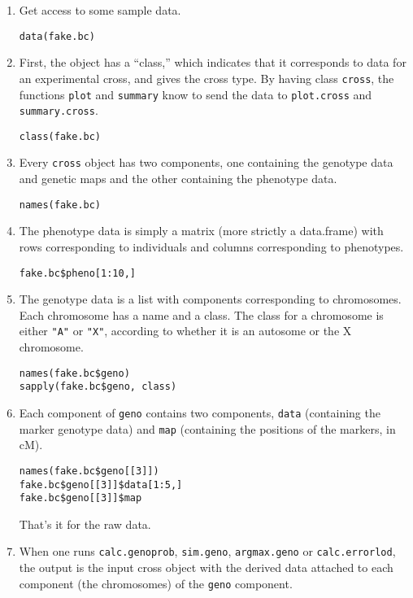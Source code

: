 \documentclass[10pt,letterpaper]{article}
\newcommand{\usercolor}{\color [named]{BlueViolet}}
\begin{document}
\begin{enumerate}

\item Get access to some sample data.

\usercolor \verb|data(fake.bc)| \normalcolor

\item First, the object has a ``class,'' which indicates that it
corresponds to data for an experimental cross, and gives the cross
type.  By having class \verb-cross-, the functions \verb-plot- and
\verb-summary- know to send the data to \verb-plot.cross- and
\verb-summary.cross-.

\usercolor \verb|class(fake.bc)| \normalcolor

\item Every \verb-cross- object has two components, one containing the
genotype data and genetic maps and the other containing the phenotype
data.

\usercolor \verb|names(fake.bc)| \normalcolor

\item The phenotype data is simply a matrix (more strictly a
data.frame) with rows corresponding to individuals and columns
corresponding to phenotypes.  

\usercolor \verb|fake.bc$pheno[1:10,]| \normalcolor %

\item  The genotype data is a list with components corresponding to
chromosomes.  Each chromosome has a name and a class.  The class for a
chromosome is either \verb-"A"- or \verb-"X"-, according to whether it
is an autosome or the X chromosome.  

\usercolor 
\verb|names(fake.bc$geno)| \\ %
\verb|sapply(fake.bc$geno, class)| %
\normalcolor

\item Each component of \verb-geno- contains two components,
\verb-data- (containing the marker genotype data) and \verb-map-
(containing the positions of the markers, in cM).

\usercolor
\verb|names(fake.bc$geno[[3]])| \\ %
\verb|fake.bc$geno[[3]]$data[1:5,]| \\ 
\verb|fake.bc$geno[[3]]$map|
\normalcolor

That's it for the raw data.

\item When one runs \verb-calc.genoprob-, \verb-sim.geno-,
\verb-argmax.geno- or \verb-calc.errorlod-, the output is the input
cross object with the derived data attached to each component (the
chromosomes) of the \verb-geno- component.  


\end{enumerate}
\end{document}
